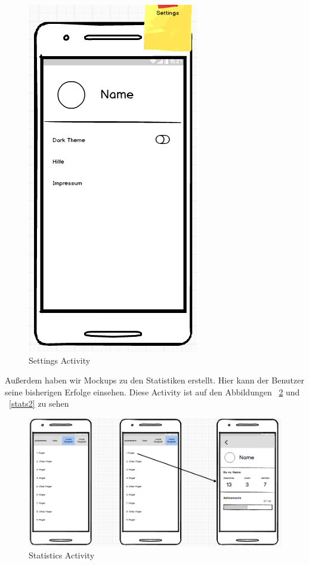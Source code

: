 \documentclass{scrartcl}
\begin{document}
\begin{figure}
	\centering
	\includegraphics[scale=0.6]{img/mockup_settings.png}
	\caption{Settings Activity}
	\label{settings}
\end{figure}

Außerdem haben wir Mockups zu den Statistiken erstellt. Hier kann der Benutzer seine bisherigen Erfolge einsehen. Diese Activity ist auf den Abbildungen ~\ref{stats1} und ~\ref{stats2} zu sehen

\begin{figure}
	\includegraphics[scale=0.58]{img/mockup_stats_1.png}
	\caption{Statistics Activity}
	\label{stats1}
\end{figure}
\end{document}
